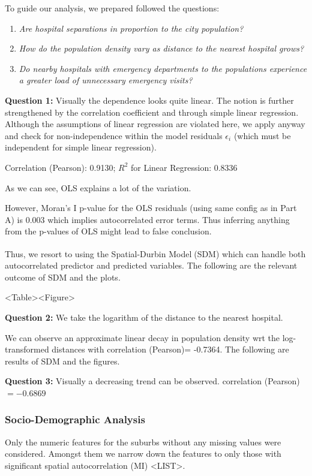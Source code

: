 \documentclass[
	a4paper, %
	10pt, %
	unnumberedsections, %
	twoside, %
]{LTJournalArticle}
\begin{document}
To guide our analysis, we prepared followed the questions:
\begin{enumerate}
  \item \textit{Are hospital separations in proportion to the city population?}
  \item \textit{How do the population density vary as distance to the nearest hospital grows?}
  \item \textit{Do nearby hospitals with emergency departments to the populations experience a greater load of unnecessary emergency visits?}
\end{enumerate}


\textbf{Question 1:} Visually the dependence looks quite linear. The notion is further strengthened by the correlation coefficient and through simple linear regression. Although the assumptions of linear regression are violated here, we apply anyway and check for non-independence within the model residuals $\epsilon_i$ (which must be independent for simple linear regression). 

Correlation (Pearson): 0.9130; $R^2$ for Linear Regression: 0.8336

As we can see, OLS explains a lot of the variation. 

However, Moran's I p-value for the OLS residuals (using same config as in Part A) is 0.003 which implies autocorrelated error terms. Thus inferring anything from the p-values of OLS might lead to false conclusion.

Thus, we resort to using the Spatial-Durbin Model\textsuperscript{\cite{atikah2021efficiency} \cite{Anselin1988} \cite{doi:10.1080/17421770601009841}} (SDM) which can handle both autocorrelated predictor and predicted variables. The following are the relevant outcome of SDM and the plots.

<Table><Figure>

\textbf{Question 2:} We take the logarithm of the distance to the nearest hospital.

We can observe an approximate linear decay in population density wrt the log-transformed distances with correlation (Pearson)= -0.7364. The following are results of SDM and the figures.

\textbf{Question 3:} Visually a decreasing trend can be observed. correlation (Pearson)$= -0.6869$


\subsubsection{Socio-Demographic Analysis}
Only the numeric features for the suburbs without any missing values were considered. Amongst them we narrow down the features to only those with significant spatial autocorrelation (MI) <LIST>. 
\end{document}
